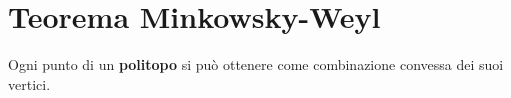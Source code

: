 \documentclass[\main/main.tex]{subfiles}
\begin{document}
\section{Teorema Minkowsky-Weyl}

\begin{theorem} \label{minkowsky}
  Ogni punto di un \textbf{politopo} si può ottenere come combinazione convessa dei suoi vertici.
\end{theorem}
\end{document}
